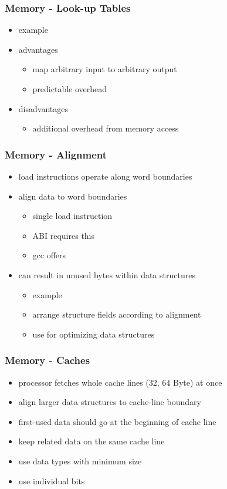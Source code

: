 \begin{frame}
 \frametitle{Memory - Look-up Tables}
 \begin{itemize}
  \item example 
  \item advantages
  \begin{itemize}
   \item map arbitrary input to arbitrary output
   \item predictable overhead
  \end{itemize}
  \item disadvantages
  \begin{itemize}
   \item additional overhead from memory access
  \end{itemize}
 \end{itemize}
\end{frame}

\begin{frame}
 \frametitle{Memory - Alignment}
 \begin{itemize}
  \item load instructions operate along word boundaries
 \end{itemize}


 \begin{itemize}
  \item align data to word boundaries
  \begin{itemize}
   \item single load instruction
   \item ABI requires this
   \item gcc offers 
  \end{itemize}
  \item can result in unused bytes within data structures
  \begin{itemize}
   \item example 
   \item arrange structure fields according to alignment
   \item use  for optimizing data structures
  \end{itemize}
 \end{itemize}
\end{frame}

\begin{frame}
 \frametitle{Memory - Caches}
 \begin{itemize}
  \item processor fetches whole cache lines (\( 32 \), \( 64 \) Byte) at once
  \item align larger data structures to cache-line boundary
  \item first-used data should go at the beginning of cache line
  \item keep related data on the same cache line
  \item use data types with minimum size
  \item use individual bits
 \end{itemize}
\end{frame}

